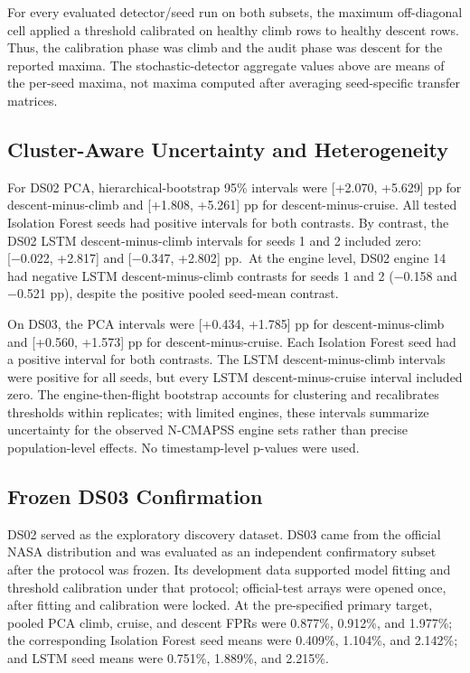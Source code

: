 \documentclass[10pt,conference]{IEEEtran}
\begin{document}
For every evaluated detector/seed run on both subsets, the maximum off-diagonal cell applied a threshold calibrated on healthy climb rows to healthy descent rows. Thus, the calibration phase was climb and the audit phase was descent for the reported maxima. The stochastic-detector aggregate values above are means of the per-seed maxima, not maxima computed after averaging seed-specific transfer matrices.

\subsection{Cluster-Aware Uncertainty and Heterogeneity}\label{cluster-aware-uncertainty-and-heterogeneity}

For DS02 PCA, hierarchical-bootstrap 95\% intervals were {[}+2.070, +5.629{]} pp for descent-minus-climb and {[}+1.808, +5.261{]} pp for descent-minus-cruise. All tested Isolation Forest seeds had positive intervals for both contrasts. By contrast, the DS02 LSTM descent-minus-climb intervals for seeds 1 and 2 included zero: {[}−0.022, +2.817{]} and {[}−0.347, +2.802{]} pp.~At the engine level, DS02 engine 14 had negative LSTM descent-minus-climb contrasts for seeds 1 and 2 (−0.158 and −0.521 pp), despite the positive pooled seed-mean contrast.

On DS03, the PCA intervals were {[}+0.434, +1.785{]} pp for descent-minus-climb and {[}+0.560, +1.573{]} pp for descent-minus-cruise. Each Isolation Forest seed had a positive interval for both contrasts. The LSTM descent-minus-climb intervals were positive for all seeds, but every LSTM descent-minus-cruise interval included zero. The engine-then-flight bootstrap accounts for clustering and recalibrates thresholds within replicates; with limited engines, these intervals summarize uncertainty for the observed N-CMAPSS engine sets rather than precise population-level effects. No timestamp-level p-values were used.

\subsection{Frozen DS03 Confirmation}\label{frozen-ds03-confirmation}

DS02 served as the exploratory discovery dataset. DS03 came from the official NASA distribution and was evaluated as an independent confirmatory subset after the protocol was frozen. Its development data supported model fitting and threshold calibration under that protocol; official-test arrays were opened once, after fitting and calibration were locked. At the pre-specified primary target, pooled PCA climb, cruise, and descent FPRs were 0.877\%, 0.912\%, and 1.977\%; the corresponding Isolation Forest seed means were 0.409\%, 1.104\%, and 2.142\%; and LSTM seed means were 0.751\%, 1.889\%, and 2.215\%.
\end{document}
